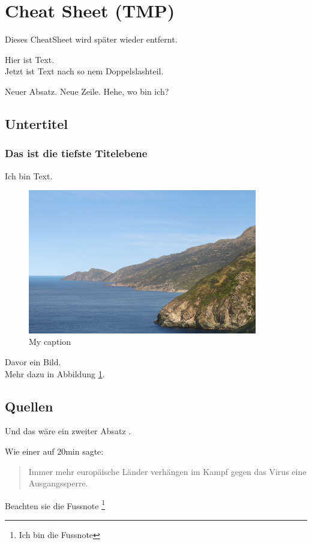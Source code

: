 \section{Cheat Sheet (TMP)}
Dieses CheatSheet wird später wieder entfernt.

Hier ist Text. \\

Jetzt ist Text nach so nem Doppelslashteil.

Neuer Absatz. \linebreak
Neue Zeile. \bigskip
Hehe, wo bin ich?

\subsection{Untertitel}
\subsubsection{Das ist die tiefste Titelebene}
Ich bin Text.
\begin{figure}[H]
    \centering
    \includegraphics[width=100mm]{images/musterBild.png}
    \caption{My caption}
    \label{fig:bsp}
\end{figure}
Davor ein Bild. \\
Mehr dazu in Abbildung \ref{fig:bsp}.

\subsection{Quellen}
Und das wäre ein zweiter Absatz \cite{ba}.

Wie einer auf 20min sagte:\cite{dev}
\begin{quote}
Immer mehr europäische Länder verhängen im Kampf gegen das Virus eine Ausgangssperre.
\end{quote}

Beachten sie die Fussnote \footnote{Ich bin die Fussnote}

